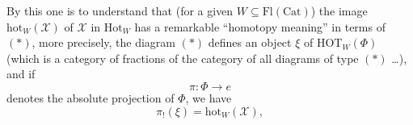 By this one is to understand that (for a given $W \subseteq \mathrm{Fl}(\mathrm{Cat})$) the image $\mathrm{hot}_W(\mathscr{X})$ of $\mathscr{X}$ in $\mathrm{Hot}_W$ has a remarkable ``homotopy meaning'' in terms of $(*)$, more precisely, the diagram $(*)$ defines an object $\xi$ of $\mathrm{HOT}_W(\Phi)$ (which is a category of fractions of the category of all diagrams of type $(*)$ \dots), and if
\[
\pi : \Phi \longrightarrow e
\]
denotes the absolute projection of $\Phi$, we have
\[
\pi_!(\xi) = \mathrm{hot}_W(\mathscr{X}),
\]
